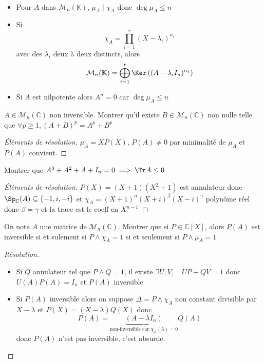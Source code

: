 \begin{csq*}~
    \begin{itemize}
        \item Pour $A$ dans $\mathcal M_n(\mathbb K)$, $\mu_A\;|\;\chi_A$ donc $\deg \mu_A\leq n$
        \item Si \[
                \chi_A=\prod_{i=1}^r(X-\lambda_i)^{\alpha_i}
            \]
            avec des $\lambda_i$ deux à deux distincts, alors \[
                \mathcal M_n(\mathbb K)=\bigoplus_{i=1}^r\Ker\left((A-\lambda_iI_n)^{\alpha_i}\right)
            \]
        \item Si $A$ est nilpotente alors $A^n=0$ car $\deg \mu_A\leq n$
    \end{itemize}
\end{csq*}

\begin{exo}
    $A\in\mathcal M_n(\mathbb C)$ non inversible. Montrer qu'il existe $B\in\mathcal M_n(\mathbb C)$ non nulle telle que $\forall p\geq 1, (A+B)^p=A^p+B^p$
\end{exo}

\begin{proof}[Éléments de résolution]
    $\mu_A=XP(X)$, $P(A)\neq 0$ par minimalité de $\mu_A$ et $P(A)$ convient.
\end{proof}

\begin{exo}
    Montrer que $A^3+A^2+A+I_n=0\implies \Tr A\leq 0$
\end{exo}
\begin{proof}[Éléments de résolution]
    $P(X)=(X+1)(X^2+1)$ est annulateur donc $\Sp_{\mathbb C}(A)\subseteq\{-1, i, -i\}$ et $\chi_A=(X+1)^{\alpha}(X+i)^{\beta}(X-i)^{\gamma}$ polynôme réel donc $\beta=\gamma$ et la trace est le coeff en $X^{n-1}$
\end{proof}

\begin{exo}
    On note $A$ une matrice de $\mathcal M_n(\mathbb C)$. Montrer que si $P\in\mathbb C[X]$, alors $P(A)$ est inversible si et sulement si $P\land \chi_A=1$ si et seulement si $P\land \mu_A=1$
\end{exo}

\begin{proof}[Résolution]~
    \begin{itemize}
        \item Si $Q$ annulateur tel que $P\land Q=1$, il existe $\exists U, V, \quad UP+QV=1$ donc $U(A)P(A)=I_n$ et $P(A)$ inversible
        \item Si $P(A)$ inversible alors on suppose $\Delta=P\land \chi_A$ non constant divisible par $X-\lambda$ et $P(X)=(X-\lambda)Q(X)$ donc \[
                P(A)=\underbrace{(A-\lambda I_n)}_{\text{non-inversible car }\chi_A(\lambda)=0}Q(A)
            \]
            donc $P(A)$ n'est pas inversible, c'est absurde.
    \end{itemize}
\end{proof}


